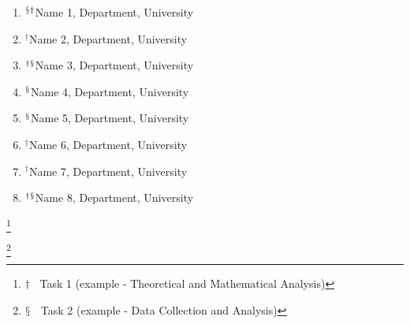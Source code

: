 \newcommand\blfootnote[1]{%
  \begingroup
  \renewcommand\thefootnote{}\footnote{#1}%
  \addtocounter{footnote}{-1}%
  \endgroup
}
\begin{teammates}
\vspace*{-3mm}{\textcolor{white}{Team}}
    \large{\begin{enumerate}
    \item {}$^\mathsection{}^\dagger$Name 1, Department, University
    \item {}$^\dagger$Name 2, Department, University
    \item {}$^\dagger{}^\mathsection$Name 3, Department, University
    \item {}$^\mathsection$Name 4, Department, University
    \item {}$^\mathsection$Name 5, Department, University
    \item {}$^\dagger$Name 6, Department, University
    \item {}$^\dagger$Name 7, Department, University
    \item {}$^\dagger{}^\mathsection$Name 8, Department, University
    \end{enumerate}}
\blfootnote{$\dagger \;\;$ Task 1 (example - Theoretical and Mathematical Analysis)}
\blfootnote{$\mathsection \;\;$ Task 2 (example - Data Collection and Analysis)}
\end{teammates}
\restoregeometry